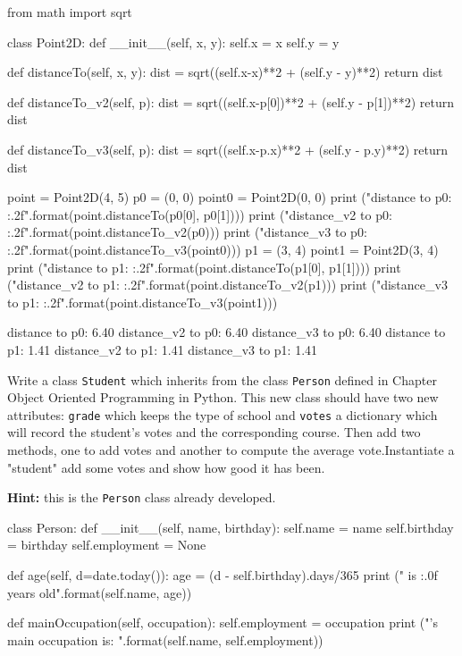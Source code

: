 \cprotEnv\begin{solution}
\begin{ipython}
from math import sqrt

class Point2D:
    def __init__(self, x, y):
        self.x = x
        self.y = y

    def distanceTo(self, x, y):
        dist = sqrt((self.x-x)**2 + (self.y - y)**2)
        return dist

    def distanceTo_v2(self, p):
        dist = sqrt((self.x-p[0])**2 + (self.y - p[1])**2)
        return dist

    def distanceTo_v3(self, p):
        dist = sqrt((self.x-p.x)**2 + (self.y - p.y)**2)
        return dist

point = Point2D(4, 5)
p0 = (0, 0)
point0 = Point2D(0, 0)
print ("distance to p0: {:.2f}".format(point.distanceTo(p0[0], p0[1])))
print ("distance_v2 to p0: {:.2f}".format(point.distanceTo_v2(p0)))
print ("distance_v3 to p0: {:.2f}".format(point.distanceTo_v3(point0)))
p1 = (3, 4)
point1 = Point2D(3, 4)
print ("distance to p1: {:.2f}".format(point.distanceTo(p1[0], p1[1])))
print ("distance_v2 to p1: {:.2f}".format(point.distanceTo_v2(p1)))
print ("distance_v3 to p1: {:.2f}".format(point.distanceTo_v3(point1)))

distance to p0: 6.40
distance\_v2 to p0: 6.40
distance\_v3 to p0: 6.40
distance to p1: 1.41
distance\_v2 to p1: 1.41
distance\_v3 to p1: 1.41
\end{ipython}
\end{solution}

\cprotEnv\begin{question}
Write a class \texttt{Student} which inherits from the class \texttt{Person} defined in Chapter Object Oriented Programming in Python. This new class should have two new attributes: \texttt{grade} which keeps the type of school and \texttt{votes} a dictionary which will record the student's votes and the corresponding course. Then add two methods, one to add votes and another to compute the average vote.Instantiate a "student" add some votes and show how good it has been.

\noindent\textbf{Hint:} this is the \texttt{Person} class already developed.

\begin{ipython}
class Person:
    def __init__(self, name, birthday):
        self.name = name
        self.birthday = birthday
        self.employment = None

    def age(self, d=date.today()):
        age = (d - self.birthday).days/365
        print ("{} is {:.0f} years old".format(self.name, age))

    def mainOccupation(self, occupation):
        self.employment = occupation
        print ("{}'s main occupation is: {}".format(self.name, self.employment))
\end{ipython}
\end{question}


